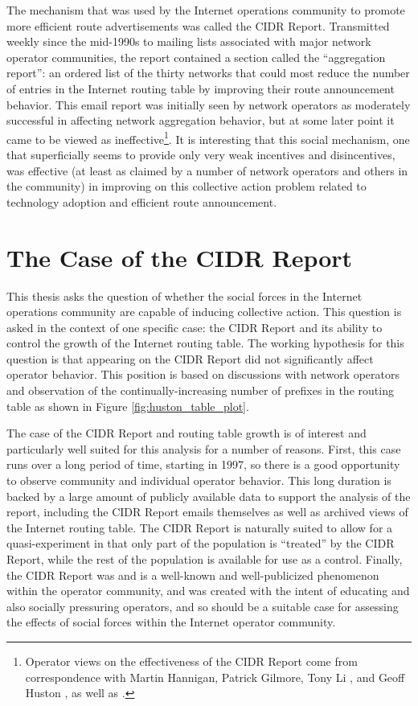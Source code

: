 The mechanism that was used by the Internet operations community to promote
more efficient route advertisements was called the CIDR Report. Transmitted
weekly since the mid-1990s to mailing lists associated with major network
operator communities, the report contained a section called the ``aggregation
report'': an ordered list of the thirty networks that could most reduce the
number of entries in the Internet routing table by improving their route
announcement behavior. This email report was initially seen by network
operators as moderately successful in affecting network aggregation behavior,
but at some later point it came to be viewed as ineffective\footnote{Operator
views on the effectiveness of the CIDR Report come from correspondence with
Martin Hannigan, Patrick Gilmore, Tony Li \cite{Li:2011vn}, and Geoff Huston
\cite{Huston:2011ys}, as well as \cite{Steenbergen:2010nx}.}. It is interesting
that this social mechanism, one that superficially seems to provide only very
weak incentives and disincentives, was effective (at least as claimed by a
number of network operators and others in the community) in improving on this
collective action problem related to technology adoption and efficient route
announcement.

\section{The Case of the CIDR Report}

This thesis asks the question of whether the social forces in the Internet
operations community are capable of inducing collective action. This question
is asked in the context of one specific case: the CIDR Report and its ability
to control the growth of the Internet routing table. The working hypothesis for
this question is that appearing on the CIDR Report did not significantly affect
operator behavior. This position is based on discussions with network operators
and observation of the continually-increasing number of prefixes in the routing
table as shown in Figure \ref{fig:huston_table_plot}.

The case of the CIDR Report and routing table growth is of interest and
particularly well suited for this analysis for a number of reasons. First, this
case runs over a long period of time, starting in 1997, so there is a good
opportunity to observe community and individual operator behavior. This long
duration is backed by a large amount of publicly available data to support the
analysis of the report, including the CIDR Report emails themselves as well as
archived views of the Internet routing table. The CIDR Report is naturally
suited to allow for a quasi-experiment in that only part of the population is
``treated'' by the CIDR Report, while the rest of the population is available
for use as a control. Finally, the CIDR Report was and is a well-known and
well-publicized phenomenon within the operator community, and was created
with the intent of educating and also socially pressuring operators, and so
should be a suitable case for assessing the effects of social forces within
the Internet operator community.

